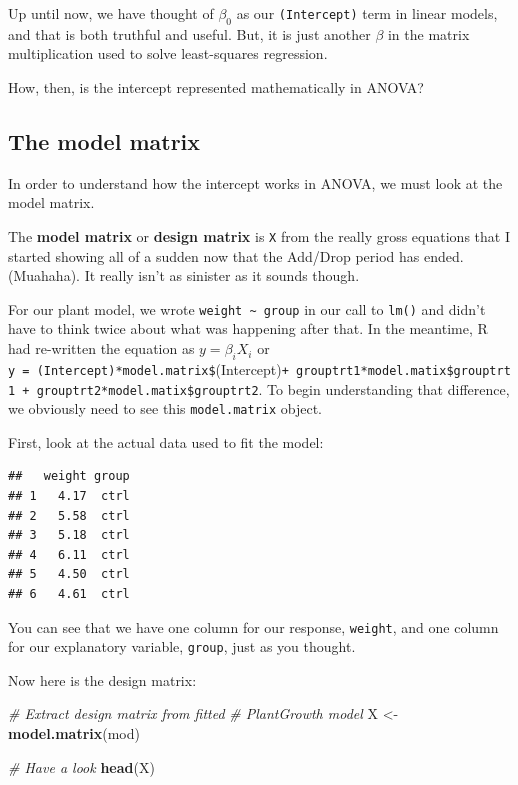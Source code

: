\documentclass[
]{book}
\newenvironment{Shaded}{\begin{snugshade}}{\end{snugshade}}
\newcommand{\CommentTok}[1]{\textcolor[rgb]{0.56,0.35,0.01}{\textit{#1}}}
\newcommand{\KeywordTok}[1]{\textcolor[rgb]{0.13,0.29,0.53}{\textbf{#1}}}
\newcommand{\NormalTok}[1]{#1}
\newcommand{\OperatorTok}[1]{\textcolor[rgb]{0.81,0.36,0.00}{\textbf{#1}}}
\newcommand{\StringTok}[1]{\textcolor[rgb]{0.31,0.60,0.02}{#1}}
\begin{document}
Up until now, we have thought of \(\beta_0\) as our \texttt{(Intercept)} term in linear models, and that is both truthful and useful. But, it is just another \(\beta\) in the matrix multiplication used to solve least-squares regression.

How, then, is the intercept represented mathematically in ANOVA?

\hypertarget{the-model-matrix}{%
\subsection{The model matrix}\label{the-model-matrix}}

In order to understand how the intercept works in ANOVA, we must look at the model matrix.

The \textbf{model matrix} or \textbf{design matrix} is \texttt{X} from the really gross equations that I started showing all of a sudden now that the Add/Drop period has ended. (Muahaha). It really isn't as sinister as it sounds though.

For our plant model, we wrote \texttt{weight\ \textasciitilde{}\ group} in our call to \texttt{lm()} and didn't have to think twice about what was happening after that. In the meantime, R had re-written the equation as \(y = \beta_i X_i\) or \texttt{y\ =\ (Intercept)*model.matrix\$}(Intercept)\texttt{+\ grouptrt1*model.matix\$grouptrt1\ +\ grouptrt2*model.matix\$grouptrt2}. To begin understanding that difference, we obviously need to see this \texttt{model.matrix} object.

First, look at the actual data used to fit the model:

\begin{Shaded}
\end{Shaded}

\begin{verbatim}
##   weight group
## 1   4.17  ctrl
## 2   5.58  ctrl
## 3   5.18  ctrl
## 4   6.11  ctrl
## 5   4.50  ctrl
## 6   4.61  ctrl
\end{verbatim}

You can see that we have one column for our response, \texttt{weight}, and one column for our explanatory variable, \texttt{group}, just as you thought.

Now here is the design matrix:

\begin{Shaded}
\begin{Highlighting}[]
\CommentTok{# Extract design matrix from fitted}
\CommentTok{# PlantGrowth model}
\NormalTok{X <-}\StringTok{ }\KeywordTok{model.matrix}\NormalTok{(mod)}

\CommentTok{# Have a look}
\KeywordTok{head}\NormalTok{(X)}
\end{Highlighting}
\end{Shaded}
\end{document}

